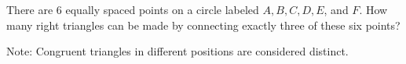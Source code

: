 There are $6$ equally spaced points on a circle labeled $A, B, C, D, E$, and $F$. How many right triangles can be made by connecting exactly three of these six points?



Note: Congruent triangles in different positions are considered distinct.
